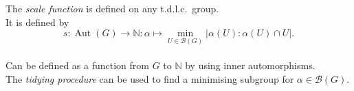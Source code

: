 \documentclass[preview]{standalone}
\begin{document}
The \textit{scale function} is defined on any t.d.l.c.\ group.\\It is defined by \[ s : \operatorname{Aut}(G) \to \mathbb{N} : \alpha \mapsto \min_{U \in \mathcal{B}(G)} |\alpha(U) : \alpha(U) \cap U |. \]\\Can be defined as a function from $G$ to $\mathbb{N}$ by using inner automorphisms.\\The \textit{tidying procedure} can be used to find a minimising subgroup for $\alpha \in \mathcal{B}(G)$.\\
\end{document}
